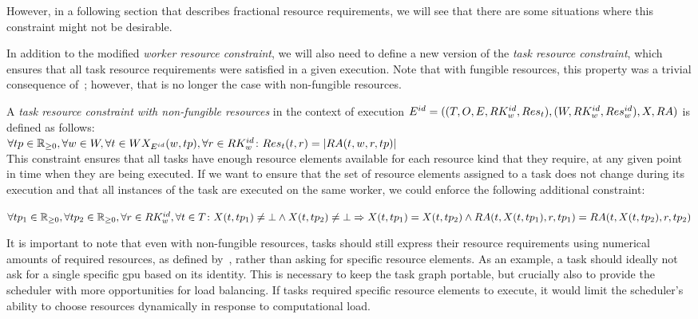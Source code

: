 However, in a following section that describes fractional resource requirements, we will see that
there are some situations where this constraint might not be desirable.

In addition to the modified \emph{worker resource constraint}, we will also need to define a new version of
the \emph{task resource constraint}, which ensures that all task resource requirements were satisfied in a
given execution. Note that with fungible resources, this property was a trivial consequence
of~; however, that is no longer the case with non-fungible resources.

\vspace{2mm}
 A
\emph{task resource constraint with non-fungible resources} in the context of execution
$E^{id} = ((T, O, E, RK_w^{id}, Res_t), (W, RK_w^{id}, Res_w^{id}), X,
RA)$ is defined as
follows: \vspace{1mm}\\
$\forall tp\in\mathbb{R}_{\geq{}0}, \forall w\in{}W, \forall
	t\in{}WX_{E^{id}}(w, tp), \forall
	r\in{}RK_w^{id}\colon Res_t(t, r) =
	|RA(t, w, r, tp)|$ \\

This constraint ensures that all tasks have enough resource elements available for each resource
kind that they require, at any given point in time when they are being executed. If we want to
ensure that the set of resource elements assigned to a task does not change during its
execution and that all instances of the task are executed on the same worker, we could enforce the
following additional constraint:

\vspace{1mm}
$\forall tp_1\in\mathbb{R}_{\geq{}0}, \forall tp_2\in\mathbb{R}_{\geq{}0}, \forall r\in RK_w^{id}, \forall t\in{}T\colon
X(t, tp_1) \neq \bot \land X(t, tp_2) \neq \bot \Rightarrow X(t, tp_1) = X(t, tp_2) \land RA(t, X(t, tp_1), r, tp_1) =
RA(t, X(t, tp_2), r, tp_2)$

\vspace{1mm}It is important to note that even with non-fungible resources, tasks should still
express their resource requirements using numerical amounts of required resources, as defined
by~, rather than asking for specific resource elements. As an example, a
task should ideally not ask for a single specific \gls{gpu} based on its identity. This is
necessary to keep the task graph portable, but crucially also to provide the scheduler with more opportunities
for load balancing. If tasks required specific resource elements to execute, it would limit the
scheduler's ability to choose resources dynamically in response to computational load.

